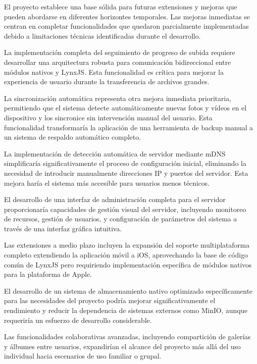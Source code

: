 El proyecto establece una base sólida para futuras extensiones y mejoras que pueden abordarse en diferentes horizontes temporales. Las mejoras inmediatas se centran en completar funcionalidades que quedaron parcialmente implementadas debido a limitaciones técnicas identificadas durante el desarrollo.

La implementación completa del seguimiento de progreso de subida requiere desarrollar una arquitectura robusta para comunicación bidireccional entre módulos nativos y LynxJS. Esta funcionalidad es crítica para mejorar la experiencia de usuario durante la transferencia de archivos grandes.

La sincronización automática representa otra mejora inmediata prioritaria, permitiendo que el sistema detecte automáticamente nuevas fotos y vídeos en el dispositivo y los sincronice sin intervención manual del usuario. Esta funcionalidad transformaría la aplicación de una herramienta de backup manual a un sistema de respaldo automático completo.

La implementación de detección automática de servidor mediante mDNS simplificaría significativamente el proceso de configuración inicial, eliminando la necesidad de introducir manualmente direcciones IP y puertos del servidor. Esta mejora haría el sistema más accesible para usuarios menos técnicos.

El desarrollo de una interfaz de administración completa para el servidor proporcionaría capacidades de gestión visual del servidor, incluyendo monitoreo de recursos, gestión de usuarios, y configuración de parámetros del sistema a través de una interfaz gráfica intuitiva.

Las extensiones a medio plazo incluyen la expansión del soporte multiplataforma completo extendiendo la aplicación móvil a iOS, aprovechando la base de código común de LynxJS pero requiriendo implementación específica de módulos nativos para la plataforma de Apple.

El desarrollo de un sistema de almacenamiento nativo optimizado específicamente para las necesidades del proyecto podría mejorar significativamente el rendimiento y reducir la dependencia de sistemas externos como MinIO, aunque requeriría un esfuerzo de desarrollo considerable.

Las funcionalidades colaborativas avanzadas, incluyendo compartición de galerías y álbumes entre usuarios, expandirían el alcance del proyecto más allá del uso individual hacia escenarios de uso familiar o grupal.

